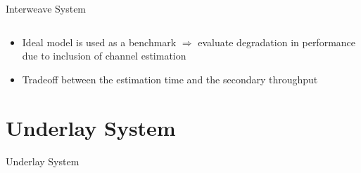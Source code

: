 \documentclass[16pt]{beamer}
\newif\ifunder
\newcommand{\fs}[2]{\fontsize{#1 pt}{#2}\selectfont}
\begin{document}
\begin{frame}[t]{Interweave System}
\begin{columns}
\begin{column}{0.55\columnwidth}
\begin{center}
{
		}
	\end{center}
	\end{column}
	\end{columns}
	\begin{block}{}
		\fs{7}{8}
		\begin{itemize}
			\item Ideal model is used as a benchmark $\Rightarrow$ evaluate degradation in performance due to inclusion of channel estimation

			\item Tradeoff between the estimation time and the secondary throughput 
		\end{itemize}		
	\end{block}	
\end{frame}

\fi

\ifunder

\section{Underlay System}
\begin{frame}[c]{}
\begin{center}
Underlay System
\end{center}
\end{frame}
\end{document}
